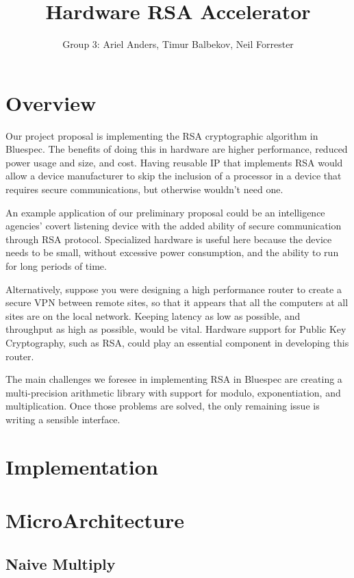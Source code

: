 \documentclass[12pt]{article}
\title{Hardware RSA Accelerator}
\author{Group 3: Ariel Anders, Timur Balbekov, Neil Forrester}
\begin{document}
\maketitle

\section{Overview}
Our project proposal is implementing the RSA cryptographic algorithm in Bluespec.
The benefits of doing this in hardware are higher performance, reduced power usage and size, and cost.
Having reusable IP that implements RSA would allow a device manufacturer to skip the inclusion
of a processor in a device that requires secure communications, but otherwise wouldn't need one. 

An example application of our preliminary proposal could be an intelligence agencies' covert listening device
with the added ability of secure communication through RSA protocol.
Specialized hardware is useful here because the device needs to be small,
without excessive power consumption, and the ability to run for long periods of time. 

Alternatively, suppose you were designing a high performance router to create a secure VPN between remote sites,
so that it appears that all the computers at all sites are on the local network.
Keeping latency as low as possible, and throughput as high as possible, would be vital.
Hardware support for Public Key Cryptography, such as RSA,
could play an essential component in developing this router.

The main challenges we foresee in implementing RSA in Bluespec are creating a multi-precision arithmetic library
with support for modulo, exponentiation, and multiplication.
Once those problems are solved, the only remaining issue is writing a sensible interface.

\section{Implementation}

\section{MicroArchitecture}

\subsection{Naive Multiply}
\end{document}
